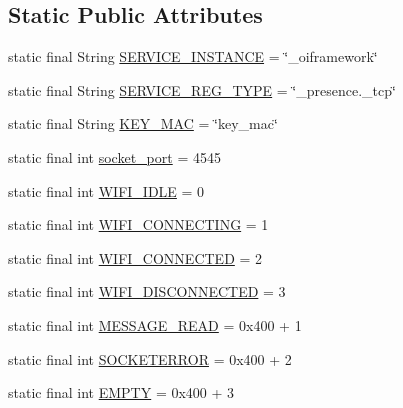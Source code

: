 \subsection*{Static Public Attributes}
\begin{DoxyCompactItemize}
\item 
static final String \hyperlink{classcom_1_1copelabs_1_1oiframework_1_1wifi_1_1_wi_fi_direct_utils_adea2f0c2cd9dd351212f19110aef1368}{S\+E\+R\+V\+I\+C\+E\+\_\+\+I\+N\+S\+T\+A\+N\+C\+E} = \char`\"{}\+\_\+oiframework\char`\"{}
\item 
static final String \hyperlink{classcom_1_1copelabs_1_1oiframework_1_1wifi_1_1_wi_fi_direct_utils_a86e43e07c9c1ea839ff38704deeaf3bd}{S\+E\+R\+V\+I\+C\+E\+\_\+\+R\+E\+G\+\_\+\+T\+Y\+P\+E} = \char`\"{}\+\_\+presence.\+\_\+tcp\char`\"{}
\item 
static final String \hyperlink{classcom_1_1copelabs_1_1oiframework_1_1wifi_1_1_wi_fi_direct_utils_a71f8b4072c3ee4779f5b101e5d03a9c6}{K\+E\+Y\+\_\+\+M\+A\+C} = \char`\"{}key\+\_\+mac\char`\"{}
\item 
static final int \hyperlink{classcom_1_1copelabs_1_1oiframework_1_1wifi_1_1_wi_fi_direct_utils_a6cc98bec21a3d65b7eb37e4c2623d840}{socket\+\_\+port} = 4545
\item 
static final int \hyperlink{classcom_1_1copelabs_1_1oiframework_1_1wifi_1_1_wi_fi_direct_utils_a03dd6a2b2574af74def9ac920b73ecf0}{W\+I\+F\+I\+\_\+\+I\+D\+L\+E} = 0
\item 
static final int \hyperlink{classcom_1_1copelabs_1_1oiframework_1_1wifi_1_1_wi_fi_direct_utils_a0a77034661f7b02844dbd4061309b973}{W\+I\+F\+I\+\_\+\+C\+O\+N\+N\+E\+C\+T\+I\+N\+G} = 1
\item 
static final int \hyperlink{classcom_1_1copelabs_1_1oiframework_1_1wifi_1_1_wi_fi_direct_utils_a96f0bca4eccbcee2e55e196ac87b883d}{W\+I\+F\+I\+\_\+\+C\+O\+N\+N\+E\+C\+T\+E\+D} = 2
\item 
static final int \hyperlink{classcom_1_1copelabs_1_1oiframework_1_1wifi_1_1_wi_fi_direct_utils_a6141c12da07bb071a6edec4c3d93605d}{W\+I\+F\+I\+\_\+\+D\+I\+S\+C\+O\+N\+N\+E\+C\+T\+E\+D} = 3
\item 
static final int \hyperlink{classcom_1_1copelabs_1_1oiframework_1_1wifi_1_1_wi_fi_direct_utils_a1981b0c3013fddb921e527a6a7f78633}{M\+E\+S\+S\+A\+G\+E\+\_\+\+R\+E\+A\+D} = 0x400 + 1
\item 
static final int \hyperlink{classcom_1_1copelabs_1_1oiframework_1_1wifi_1_1_wi_fi_direct_utils_a663c597427a723f9ca08494f934ca9a5}{S\+O\+C\+K\+E\+T\+E\+R\+R\+O\+R} = 0x400 + 2
\item 
static final int \hyperlink{classcom_1_1copelabs_1_1oiframework_1_1wifi_1_1_wi_fi_direct_utils_a67cfc153318a34079ff525c3e56ee0cb}{E\+M\+P\+T\+Y} = 0x400 + 3
\end{DoxyCompactItemize}
